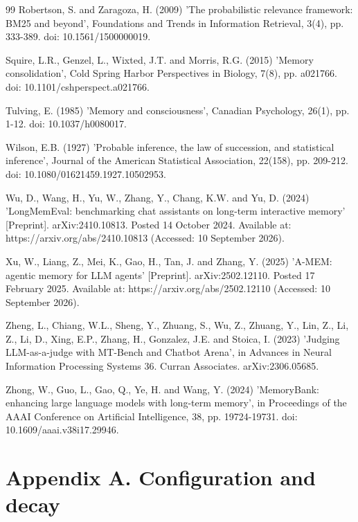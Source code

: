 \documentclass[10pt,a4paper,twocolumn]{article}
\begin{document}
\begin{thebibliography}{99}
Robertson, S. and Zaragoza, H. (2009) 'The probabilistic relevance framework: BM25 and beyond', Foundations and Trends in Information Retrieval, 3(4), pp. 333-389. doi: 10.1561/1500000019.

Squire, L.R., Genzel, L., Wixted, J.T. and Morris, R.G. (2015) 'Memory consolidation', Cold Spring Harbor Perspectives in Biology, 7(8), pp. a021766. doi: 10.1101/cshperspect.a021766.

Tulving, E. (1985) 'Memory and consciousness', Canadian Psychology, 26(1), pp. 1-12. doi: 10.1037/h0080017.

Wilson, E.B. (1927) 'Probable inference, the law of succession, and statistical inference', Journal of the American Statistical Association, 22(158), pp. 209-212. doi: 10.1080/01621459.1927.10502953.

Wu, D., Wang, H., Yu, W., Zhang, Y., Chang, K.W. and Yu, D. (2024) 'LongMemEval: benchmarking chat assistants on long-term interactive memory' [Preprint]. arXiv:2410.10813. Posted 14 October 2024. Available at: https://arxiv.org/abs/2410.10813 (Accessed: 10 September 2026).

Xu, W., Liang, Z., Mei, K., Gao, H., Tan, J. and Zhang, Y. (2025) 'A-MEM: agentic memory for LLM agents' [Preprint]. arXiv:2502.12110. Posted 17 February 2025. Available at: https://arxiv.org/abs/2502.12110 (Accessed: 10 September 2026).

Zheng, L., Chiang, W.L., Sheng, Y., Zhuang, S., Wu, Z., Zhuang, Y., Lin, Z., Li, Z., Li, D., Xing, E.P., Zhang, H., Gonzalez, J.E. and Stoica, I. (2023) 'Judging LLM-as-a-judge with MT-Bench and Chatbot Arena', in Advances in Neural Information Processing Systems 36. Curran Associates. arXiv:2306.05685.

Zhong, W., Guo, L., Gao, Q., Ye, H. and Wang, Y. (2024) 'MemoryBank: enhancing large language models with long-term memory', in Proceedings of the AAAI Conference on Artificial Intelligence, 38, pp. 19724-19731. doi: 10.1609/aaai.v38i17.29946.

\end{thebibliography}

\section*{Appendix A. Configuration and decay}
\end{document}
